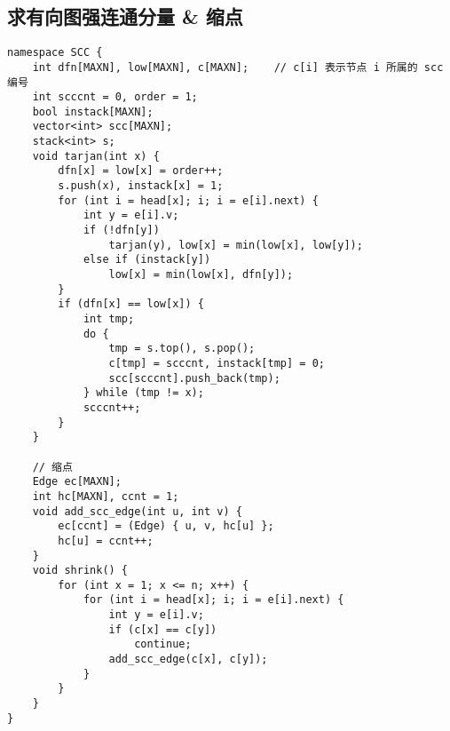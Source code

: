 \subsection{求有向图强连通分量 \& 缩点}
\begin{verbatim}
namespace SCC {
    int dfn[MAXN], low[MAXN], c[MAXN];    // c[i] 表示节点 i 所属的 scc 编号 
    int scccnt = 0, order = 1;
    bool instack[MAXN];
    vector<int> scc[MAXN];
    stack<int> s;
    void tarjan(int x) {
        dfn[x] = low[x] = order++;
        s.push(x), instack[x] = 1;
        for (int i = head[x]; i; i = e[i].next) {
            int y = e[i].v;
            if (!dfn[y])
                tarjan(y), low[x] = min(low[x], low[y]);
            else if (instack[y])
                low[x] = min(low[x], dfn[y]);
        }
        if (dfn[x] == low[x]) {
            int tmp;
            do {
                tmp = s.top(), s.pop();
                c[tmp] = scccnt, instack[tmp] = 0;
                scc[scccnt].push_back(tmp);
            } while (tmp != x);
            scccnt++;
        }
    }

    // 缩点
    Edge ec[MAXN];
    int hc[MAXN], ccnt = 1;
    void add_scc_edge(int u, int v) {
        ec[ccnt] = (Edge) { u, v, hc[u] };
        hc[u] = ccnt++;
    }
    void shrink() {
        for (int x = 1; x <= n; x++) {
            for (int i = head[x]; i; i = e[i].next) {
                int y = e[i].v;
                if (c[x] == c[y])
                    continue;
                add_scc_edge(c[x], c[y]);
            }
        }    
    }
}
\end{verbatim}
\clearpage